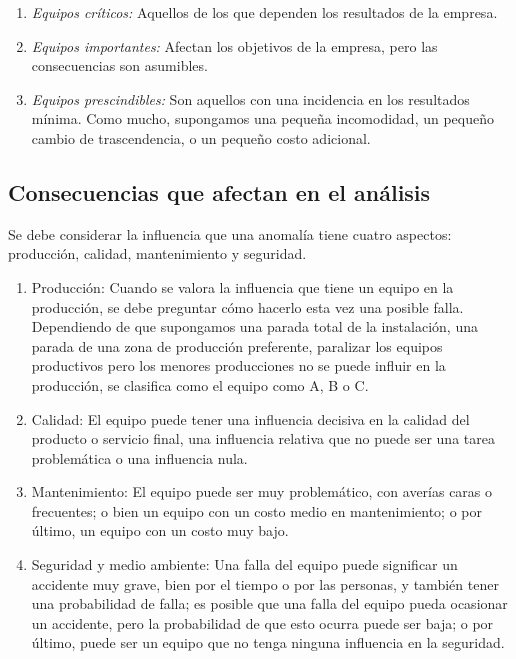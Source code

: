 \documentclass[../main]{subfiles}
\begin{document}
\begin{enumerate}
    \item \emph{Equipos críticos:} Aquellos de los que dependen los resultados de la empresa.
\item \emph{Equipos importantes:} Afectan los objetivos de la empresa, pero las consecuencias son asumibles.
\item \emph{Equipos prescindibles:} Son aquellos con una incidencia en los resultados mínima. Como mucho, supongamos una pequeña incomodidad, un pequeño cambio de trascendencia, o un pequeño costo adicional.
\end{enumerate}
\subsection{Consecuencias que afectan en el análisis}
 Se debe considerar la influencia que una anomalía tiene cuatro aspectos: producción, calidad, mantenimiento y seguridad.
\begin{enumerate}
    \item  Producción:  Cuando se valora la influencia que tiene un equipo en la producción, se debe preguntar cómo hacerlo esta vez una posible falla. Dependiendo de que supongamos una parada total de la instalación, una parada de una zona de producción preferente, paralizar los equipos productivos pero los menores producciones no se puede influir en la producción, se clasifica como el equipo como A, B o C.

    \item  Calidad: El equipo puede tener una influencia decisiva en la calidad del producto o servicio final, una influencia relativa que no puede ser una tarea problemática o una influencia nula. 

    \item  Mantenimiento: El equipo puede ser muy problemático, con averías caras o frecuentes; o bien un equipo con un costo medio en mantenimiento; o por último, un equipo con un costo muy bajo. 

    \item Seguridad y medio ambiente:  Una falla del equipo puede significar un accidente muy grave, bien por el tiempo o por las personas, y también tener una probabilidad de falla; es posible que una falla del equipo pueda ocasionar un accidente, pero la probabilidad de que esto ocurra puede ser baja; o por último, puede ser un equipo que no tenga ninguna influencia en la seguridad. 
\end{enumerate}
\end{document}
